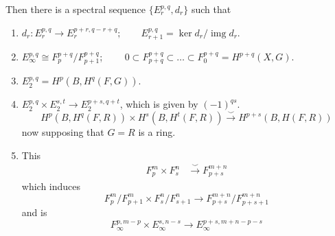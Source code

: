\documentclass{article}
\DeclareMathOperator{\img}{img}
\begin{document}
Then there is a spectral sequence $\{E_r^{p,q},d_r\}$ such that
\begin{enumerate}[label*=\alph*.]
	\item $d_r:E_r^{p,q}\to E_r^{p+r,q-r+q};\qquad E_{r+1}^{p,q}=\ker d_r/\img d_r$.
	\item $E_{\infty}^{p,q}\cong F^{p+q}_p/F^{p+q}_{p+1}$; $\qquad 0\subset F^{p+q}_{p+q}\subset\ldots\subset F^{p+q}_0=H^{p+q}(X,G)$.
	\item $E^{p,q}_2=H^p(B,H^{q}(F,G))$.
	\item $E^{p,q}_2\times E^{s,t}_2\to E^{p+s,q+t}_2$, which is given by $(-1)^{qs}$.
	\[H^p(B,H^q(F,R))\times H^s(B,H^t(F,R))\overset{\smile}{\to} H^{p+s}(B,H(F,R))\]
	now supposing that $G=R$ is a ring.
	\item This
	\begin{align*}
		F^m_p\times F^n_s&\overset{\smile}{\to}F^{m+n}_{p+s}
	\end{align*}
	which induces
	\[F^m_p/F^m_{p+1}\times F^n_s/F^n_{s+1}\to F^{m+n}_{p+s}/F^{m+n}_{p+s+1}\]
	and is
	\[F_\infty^{p,m-p}\times E_\infty^{s,n-s}\to E_{\infty}^{p+s,m+n-p-s}\]
\end{enumerate}
\clearpage
\printbibliography
\end{document}

